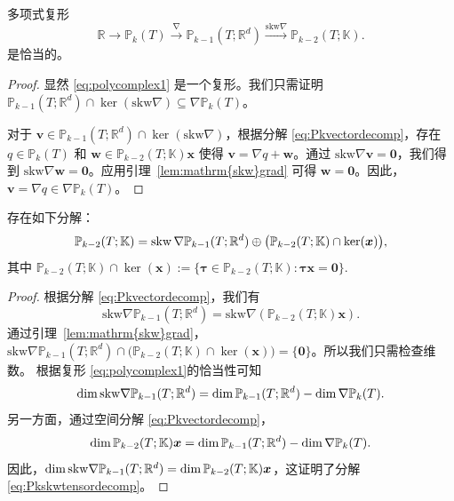 \begin{lemma}
多项式复形
\begin{equation}\label{eq:polycomplex1}
\mathbb R\xrightarrow{}\mathbb P_k(T)\xrightarrow{\nabla}\mathbb
P_{k-1}(T;\mathbb R^d)\xrightarrow{\mathrm{skw}\nabla}\mathbb P_{k-2}(T;\mathbb
K).
\end{equation}
是恰当的。
\end{lemma}
\begin{proof}
显然 \eqref{eq:polycomplex1} 是一个复形。我们只需证明 $\mathbb P_{k-1}(T;\mathbb R^d)\cap\ker(\mathrm{skw}\nabla)\subseteq\nabla\mathbb P_{k}(T)$。

对于 $\boldsymbol{v}\in\mathbb P_{k-1}(T;\mathbb R^d)\cap\ker(\mathrm{skw}\nabla)$，根据分解 \eqref{eq:Pkvectordecomp}，存在 $q\in \mathbb P_k(T)$ 和 $\boldsymbol{w}\in\mathbb P_{k-2}(T;\mathbb K)\boldsymbol{x}$ 使得 $\boldsymbol{v}=\nabla q+\boldsymbol{w}$。通过 $\mathrm{skw}\nabla\boldsymbol{v}=\boldsymbol{0}$，我们得到 $\mathrm{skw}\nabla\boldsymbol{w}=\boldsymbol{0}$。应用引理~\ref{lem:mathrm{skw}grad} 可得 $\boldsymbol{w}=\boldsymbol{0}$。因此，$\boldsymbol{v}=\nabla q\in\nabla\mathbb P_k(T)$。
\end{proof}

\begin{lemma}  
存在如下分解：
\begin{equation}\label{eq:Pkskwtensordecomp}  
\mathbb P_{k-2}(T;\mathbb K)=\operatorname{skw}\nabla\mathbb P_{k-1}(T;\mathbb R^d)\oplus\big(\mathbb P_{k-2}(T;\mathbb K)\cap\ker(\boldsymbol{x})\big),
\end{equation}  
其中
$
\mathbb P_{k-2}(T;\mathbb K)\cap\ker(\boldsymbol{x}):=\{\boldsymbol{\tau}\in\mathbb P_{k-2}(T;\mathbb K): \boldsymbol{\tau}\boldsymbol{x}=\boldsymbol{0}\}.
$
\end{lemma}  
\begin{proof}  
根据分解 \eqref{eq:Pkvectordecomp}，我们有
\[
\mathrm{skw}\nabla\mathbb P_{k-1}(T;\mathbb R^d)=\mathrm{skw}\nabla(\mathbb P_{k-2}(T;\mathbb K)\boldsymbol{x}).
\]
通过引理~\ref{lem:mathrm{skw}grad}，$\mathrm{skw}\nabla\mathbb P_{k-1}(T;\mathbb
R^d)\cap\big(\mathbb P_{k-2}(T;\mathbb
K)\cap\ker(\boldsymbol{x})\big)=\{\boldsymbol{0}\}$。所以我们只需检查维数。
根据复形 \eqref{eq:polycomplex1}的恰当性可知
\begin{equation}\label{eq:20220324-1}
\operatorname{dim}\mathrm{skw}\nabla\mathbb P_{k-1}(T;\mathbb R^d)=\operatorname{dim}\mathbb P_{k-1}(T;\mathbb R^d)-\operatorname{dim}\nabla\mathbb P_k(T).
\end{equation}
另一方面，通过空间分解 \eqref{eq:Pkvectordecomp}，
\[
\operatorname{dim}\mathbb P_{k-2}(T;\mathbb K)\boldsymbol{x}=\operatorname{dim}\mathbb P_{k-1}(T;\mathbb R^{d})-\operatorname{dim}\nabla\mathbb P_k(T).
\]
因此，$\operatorname{dim}\mathrm{skw}\nabla\mathbb P_{k-1}(T;\mathbb R^d)=\operatorname{dim}\mathbb
P_{k-2}(T;\mathbb K)\boldsymbol{x}$，这证明了分解
\eqref{eq:Pkskwtensordecomp}。
\end{proof}


